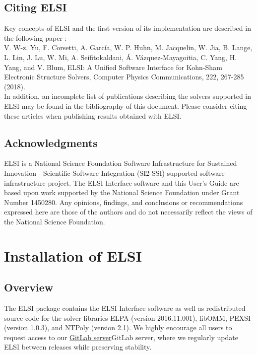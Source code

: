 \documentclass{report}
\begin{document}
\section{Citing ELSI}
\label{sec:cite}
Key concepts of ELSI and the first version of its implementation are described in the following paper \cite{elsi_yu_2018}:\\

V. W-z. Yu, F. Corsetti, A. Garc\'{i}a, W. P. Huhn, M. Jacquelin, W. Jia, B. Lange, L. Lin, J. Lu, W. Mi, A. Seifitokaldani, \'{A}. V\'{a}zquez-Mayagoitia, C. Yang, H. Yang, and V. Blum, ELSI: A Unified Software Interface for Kohn-Sham Electronic Structure Solvers, Computer Physics Communications, 222, 267-285 (2018).\\

In addition, an incomplete list of publications describing the solvers supported in ELSI may be found in the bibliography of this document.  Please consider citing these articles when publishing results obtained with ELSI.\\

\section{Acknowledgments}
\label{sec:thanks}
ELSI is a National Science Foundation Software Infrastructure for Sustained Innovation - Scientific Software Integration (SI2-SSI) supported software infrastructure project.  The ELSI Interface software and this User's Guide are based upon work supported by the National Science Foundation under Grant Number 1450280.  Any opinions, findings, and conclusions or recommendations expressed here are those of the authors and do not necessarily reflect the views of the National Science Foundation.\\

\chapter{Installation of ELSI}
\section{Overview}
\label{sec:install}
The ELSI package contains the ELSI Interface software as well as redistributed source code for the solver libraries ELPA (version 2016.11.001), libOMM, PEXSI (version 1.0.3), and NTPoly (version 2.1).  We highly encourage all users to request access to our \href{http://git.elsi-interchange.org/elsi-devel}{GitLab server}GitLab server, where we regularly update ELSI between releases while preserving stability.\\
\end{document}
